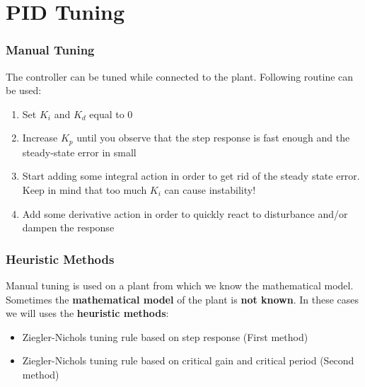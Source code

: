 \section{PID Tuning}

\begin{frame}
	\frametitle{Manual Tuning}
	The controller can be tuned while connected to the plant. Following routine can be used:
	\begin{enumerate}
		\item Set $K_i$ and $K_d$ equal to 0
		\item Increase $K_p$ until you observe that the step response is fast enough and the steady-state error in small
		\item Start adding some integral action in order to get rid of the steady state error. Keep in mind that too much $K_i$ can cause instability!
		\item Add some derivative action in order to quickly react to disturbance and/or dampen the response
	\end{enumerate}
\end{frame}


\begin{frame}
	\frametitle{Heuristic Methods}
	Manual tuning is used on a plant from which we know the mathematical model.\\
	\vspace{1em}
	Sometimes the \textbf{mathematical model} of the plant is \textbf{not known}. In these cases we will uses the \textbf{heuristic methods}:
	\begin{itemize}
		\item Ziegler-Nichols tuning rule based on step response (First method)
		\item Ziegler-Nichols tuning rule based on critical gain and critical period (Second method)
	\end{itemize}
\end{frame}

